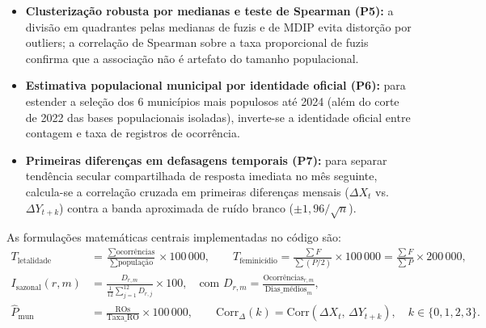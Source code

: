 \documentclass[11pt,a4paper]{article}
\begin{document}
\begin{itemize}
  \item \textbf{Clusterização robusta por medianas e teste de Spearman (P5):} a divisão em quadrantes pelas medianas de fuzis e de MDIP evita distorção por outliers; a correlação de Spearman sobre a taxa proporcional de fuzis confirma que a associação não é artefato do tamanho populacional.
  \item \textbf{Estimativa populacional municipal por identidade oficial (P6):} para estender a seleção dos 6 municípios mais populosos até 2024 (além do corte de 2022 das bases populacionais isoladas), inverte-se a identidade oficial entre contagem e taxa de registros de ocorrência.
  \item \textbf{Primeiras diferenças em defasagens temporais (P7):} para separar tendência secular compartilhada de resposta imediata no mês seguinte, calcula-se a correlação cruzada em primeiras diferenças mensais ($\Delta X_t$ vs.\ $\Delta Y_{t+k}$) contra a banda aproximada de ruído branco ($\pm 1{,}96 / \sqrt{n}$).
\end{itemize}

As formulações matemáticas centrais implementadas no código são:
\begin{align}
  T_{\text{letalidade}} &= \frac{\sum \text{ocorrências}}{\sum \text{população}} \times 100\,000, \qquad
  T_{\text{feminicídio}} = \frac{\sum F}{\sum (P / 2)} \times 100\,000 = \frac{\sum F}{\sum P} \times 200\,000, \\[4pt]
  I_{\text{sazonal}}(r, m) &= \frac{D_{r,m}}{\frac{1}{12}\sum_{j=1}^{12} D_{r,j}} \times 100, \quad \text{com } D_{r,m} = \frac{\text{Ocorrências}_{r,m}}{\text{Dias\_médios}_m}, \\[4pt]
  \widehat{P}_{\text{mun}} &= \frac{\text{ROs}}{\text{Taxa\_RO}} \times 100\,000, \qquad
  \text{Corr}_{\Delta}(k) = \text{Corr}(\Delta X_t,\, \Delta Y_{t+k}), \quad k \in \{0,1,2,3\}.
\end{align}
\end{document}
